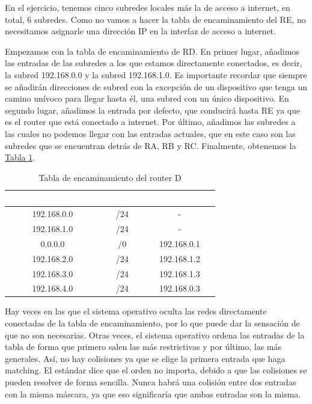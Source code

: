 \documentclass[10pt,a4paper,spanish]{report}
\begin{document}
En el ejercicio, tenemos cinco subredes locales más la de acceso a internet, en total, 6 subredes. Como no vamos a hacer la tabla de encaminamiento del RE, no necesitamos asignarle una dirección IP en la interfaz de acceso a internet.

Empezamos con la tabla de encaminamiento de RD. En primer lugar, añadimos las entradas de las subredes a los que estamos directamente conectados, es decir, la subred 192.168.0.0 y la subred 192.168.1.0. Es importante recordar que siempre se añadirán direcciones de subred con la excepción de un dispositivo que tenga un camino unívoco para llegar hasta él, una subred con un único dispositivo. En segundo lugar, añadimos la entrada por defecto, que conducirá hasta RE ya que es el router que está conectado a internet. Por último, añadimos las subredes a las cuales no podemos llegar con las entradas actuales, que en este caso son las subredes que se encuentran detrás de RA, RB y RC. Finalmente, obtenemos la \hyperref[rd]{Tabla \ref*{rd}}.

\begin{table}[H]
  \centering
  \begin{tabular}{|c|c|c|}
    \hline
    \rowcolor[rgb]{0.0,0.58,0.71} \textcolor{white}{Dirección IP destino} & \textcolor{white}{Máscara} & \textcolor{white}{Siguiente nodo} \\
    \hline
     192.168.0.0 & /24 & - \\
    \hline
     192.168.1.0 & /24 & - \\
    \hline
     0.0.0.0 & /0 & 192.168.0.1 \\
    \hline
     192.168.2.0 & /24 & 192.168.1.2 \\
    \hline
     192.168.3.0 & /24 & 192.168.1.3 \\
    \hline
     192.168.4.0 & /24 & 192.168.0.3 \\
    \hline
  \end{tabular}
  \caption{Tabla de encaminamiento del router D}
  \label{rd}
\end{table}

Hay veces en las que el sistema operativo oculta las redes directamente conectadas de la tabla de encaminamiento, por lo que puede dar la sensación de que no son necesarias. Otras veces, el sistema operativo ordena las entradas de la tabla de forma que primero salen las más restrictivas y por último, las más generales. Así, no hay colisiones ya que se elige la primera entrada que haga matching. El estándar dice que el orden no importa, debido a que las colisiones se pueden resolver de forma sencilla. Nunca habrá una colisión entre dos entradas con la misma máscara, ya que eso significaría que ambas entradas son la misma.
\end{document}
